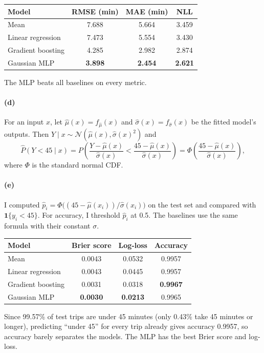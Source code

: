 \documentclass[11pt]{article}
\begin{document}
\begin{table}[H]
\centering
\begin{tabular}{lccc}
\toprule
Model & RMSE (min) & MAE (min) & NLL \\
\midrule
Mean & 7.688 & 5.664 & 3.459 \\
Linear regression & 7.473 & 5.554 & 3.430 \\
Gradient boosting & 4.285 & 2.982 & 2.874 \\
Gaussian MLP & \textbf{3.898} & \textbf{2.454} & \textbf{2.621} \\
\bottomrule
\end{tabular}
\end{table}
The MLP beats all baselines on every metric.

\paragraph{(d)}
For an input $x$, let $\hat\mu(x)=f_{\hat\mu}(x)$ and $\hat\sigma(x)=f_{\hat\sigma}(x)$ be the fitted model's outputs. Then $Y\mid x\sim\mathcal{N}(\hat\mu(x),\hat\sigma(x)^2)$ and
\[
\hat P(Y<45\mid x)=P\!\left(\frac{Y-\hat\mu(x)}{\hat\sigma(x)}<\frac{45-\hat\mu(x)}{\hat\sigma(x)}\right)=\Phi\!\left(\frac{45-\hat\mu(x)}{\hat\sigma(x)}\right),
\]
where $\Phi$ is the standard normal CDF.

\paragraph{(e)}
I computed $\hat p_i=\Phi\big((45-\hat\mu(x_i))/\hat\sigma(x_i)\big)$ on the test set and compared with $\mathbf 1\{y_i<45\}$. For accuracy, I threshold $\hat p_i$ at 0.5. The baselines use the same formula with their constant $\sigma$.

\begin{table}[H]
\centering
\begin{tabular}{lccc}
\toprule
Model & Brier score & Log-loss & Accuracy \\
\midrule
Mean & 0.0043 & 0.0532 & 0.9957 \\
Linear regression & 0.0043 & 0.0445 & 0.9957 \\
Gradient boosting & 0.0031 & 0.0318 & \textbf{0.9967} \\
Gaussian MLP & \textbf{0.0030} & \textbf{0.0213} & 0.9965 \\
\bottomrule
\end{tabular}
\end{table}
Since 99.57\% of test trips are under 45 minutes (only 0.43\% take 45 minutes or longer), predicting ``under 45'' for every trip already gives accuracy 0.9957, so accuracy barely separates the models. The MLP has the best Brier score and log-loss.
\end{document}
